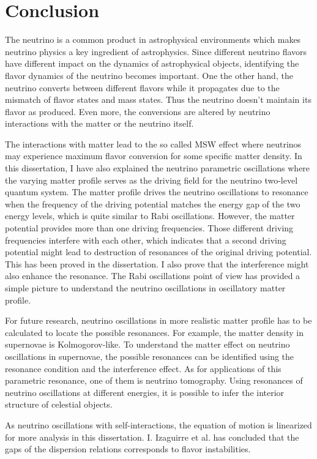 \chapter{\label{chap:conclusion}Conclusion}


The neutrino is a common product in astrophysical environments which makes neutrino physics a key ingredient of astrophysics. Since different neutrino flavors have different impact on the dynamics of astrophysical objects, identifying the flavor dynamics of the neutrino becomes important. One the other hand, the neutrino converts between different flavors while it propagates due to the mismatch of flavor states and mass states. Thus the neutrino doesn't maintain its flavor as produced. Even more, the conversions are altered by neutrino interactions with the matter or the neutrino itself. 

The interactions with matter lead to the so called MSW effect where neutrinos may experience maximum flavor conversion for some specific matter density. In this dissertation, I have also explained the neutrino parametric oscillations where the varying matter profile serves as the driving field for the neutrino two-level quantum system. The matter profile drives the neutrino oscillations to resonance when the frequency of the driving potential matches the energy gap of the two energy levels, which is quite similar to Rabi oscillations. However, the matter potential provides more than one driving frequencies. Those different driving frequencies interfere with each other, which indicates that a second driving potential might lead to destruction of resonances of the original driving potential. This has been proved in the dissertation. I also prove that the interference might also enhance the resonance. The Rabi oscillations point of view has provided a simple picture to understand the neutrino oscillations in oscillatory matter profile.

For future research, neutrino oscillations in more realistic matter profile has to be calculated to locate the possible resonances. For example, the matter density in supernovae is Kolmogorov-like. To understand the matter effect on neutrino oscillations in supernovae, the possible resonances can be identified using the resonance condition and the interference effect. As for applications of this parametric resonance, one of them is neutrino tomography. Using resonances of neutrino oscillations at different energies, it is possible to infer the interior structure of celestial objects.

As neutrino oscillations with self-interactions, the equation of motion is linearized for more analysis in this dissertation. I. Izaguirre et al. has concluded that the gaps of the dispersion relations corresponds to flavor instabilities.
